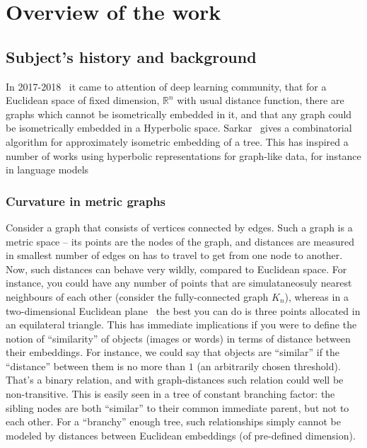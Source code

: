 %


\chapter{Overview of the work}

\section{Subject's history and background} \label{sec:history}

In 2017-2018~\cite{nickelKiela17} it came to attention of deep learning community, that for a
Euclidean space of fixed dimension, \( \mathbb{R}^n \) with usual distance
function, there are graphs which cannot be isometrically embedded in it, and
that any graph could be isometrically embedded in a Hyperbolic space.
Sarkar~\cite{sarkar} gives a combinatorial algorithm for approximately
isometric embedding of a tree. This has inspired a number of works using
hyperbolic representations for graph-like data, for instance in language models

\subsection*{Curvature in metric graphs}

Consider a graph that consists of vertices connected by edges. Such a graph is
a metric space -- its points are the nodes of the graph, and distances are
measured in smallest number of edges on has to travel to get from one node to
another.  Now, such distances can behave very wildly, compared to Euclidean
space. For instance, you could have any number of points that are
simulataneosuly nearest neighbours of each other (consider the fully-connected
graph \( K_n \)), whereas in a two-dimensional Euclidean
plane~\cite{howManyNeighbours} the best you can do is three points allocated in
an equilateral triangle. This has immediate implications if you were to define
the notion of ``similarity'' of objects (images or words) in terms of distance
between their embeddings.  For instance, we could say that objects are
``similar'' if the ``distance'' between them is no more than \( 1 \) (an
arbitrarily chosen threshold).  That's a binary relation, and with
graph-distances such relation could well be non-transitive. This is easily seen
in a tree of constant branching factor: the sibling nodes are both ``similar''
to their common immediate parent, but not to each other. For a ``branchy''
enough tree, such relationships simply cannot be modeled by distances between
Euclidean embeddings (of pre-defined dimension).

